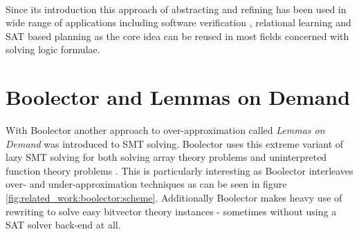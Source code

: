 \paragraph{}
Since its introduction this approach of abstracting and refining has been used in wide range of applications including software verification \cite{CEGAR}, relational learning \cite{CEGAR-Relational-Learning} and SAT based planning \cite{CEGAR-Planning} as the core idea can be reused in most fields concerned with solving logic formulae.



\section{Boolector and Lemmas on Demand}
\label{par:related_work:boolector}
With Boolector \cite{Brummayer-Biere2009_Chapter_BoolectorAnEfficientSMTSolverF} another approach to over-approximation called \textit{Lemmas on Demand} was introduced to SMT solving. Boolector uses this extreme variant of lazy SMT solving for both solving array theory problems \cite{p6-brummayer} and uninterpreted function theory problems \cite{NiemetzPreinerBiere-FMCAD14}.
This is particularly interesting as Boolector interleaves over- and under-approximation techniques as can be seen in figure \ref{fig:related_work:boolector:scheme}.
Additionally Boolector makes heavy use of rewriting to solve easy bitvector theory instances - sometimes without using a SAT solver back-end at all.
